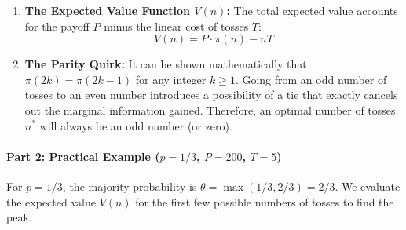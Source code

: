 \begin{enumerate}
    \item \textbf{The Expected Value Function $V(n)$:} The total expected value accounts for the payoff $P$ minus the linear cost of tosses $T$:
    \begin{equation}
        V(n) = P \cdot \pi(n) - nT
    \end{equation}
    
    \item \textbf{The Parity Quirk:} It can be shown mathematically that $\pi(2k) = \pi(2k-1)$ for any integer $k \ge 1$. Going from an odd number of tosses to an even number introduces a possibility of a tie that exactly cancels out the marginal information gained. Therefore, an optimal number of tosses $n^*$ will always be an odd number (or zero).
\end{enumerate}

\paragraph{Part 2: Practical Example ($p = 1/3$, $P = 200$, $T = 5$)}

For $p = 1/3$, the majority probability is $\theta = \max(1/3, 2/3) = 2/3$. We evaluate the expected value $V(n)$ for the first few possible numbers of tosses to find the peak.

